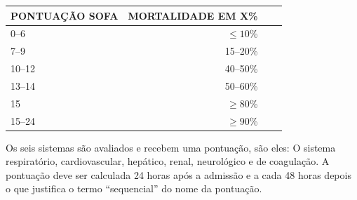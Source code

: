 \documentclass[12pt]{article}
\begin{document}
\begin{center}
    \begin{tabular}{l r r r}
        \hline
        PONTUAÇÃO SOFA & MORTALIDADE EM X\% \\
        \hline
            0–6	& $\leq 10$\% \\
            7–9	& 15–20\% \\
            10–12 & 40–50\% \\
            13–14 & 50–60\% \\
            15 & $\geq80$\% \\
            15–24 & $\geq90$\% \\
        \hline
    \end{tabular}
\end{center}


Os seis sistemas são avaliados e recebem uma pontuação, são eles: O sistema respiratório, cardiovascular, hepático, renal, neurológico e de coagulação. A pontuação deve ser calculada 24 horas após a admissão e a cada 48 horas depois o que  justifica o termo “sequencial” do nome da pontuação.
\end{document}
